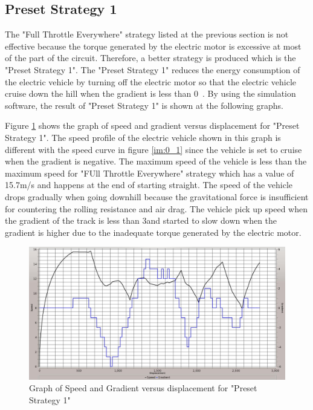 \subsection{Preset Strategy 1}

The "Full Throttle Everywhere" strategy listed at the previous section is not effective because the torque generated by the electric motor is excessive at most of the part of the circuit. Therefore, a better strategy is produced which is the "Preset Strategy 1". The "Preset Strategy 1" reduces the energy consumption of the electric vehicle by turning off the electric motor so that the electric vehicle cruise down the hill when the gradient is less than 0\textdegree \ . By using the simulation software, the result of "Preset Strategy 1" is shown at the following graphs.

Figure \ref{im:1_1} shows the graph of speed and gradient versus displacement for "Preset Strategy 1". The speed profile of the electric vehicle shown in this graph is different with the speed curve in figure \ref{im:0_1} since the vehicle is set to cruise when the gradient is negative. The maximum speed of the vehicle is less than the maximum speed for "FUll Throttle Everywhere" strategy which has a value of 15.7m/s and happens at the end of starting straight. The speed of the vehicle drops gradually when going downhill because the gravitational force is insufficient for countering the rolling resistance and air drag. The vehicle pick up speed when the gradient of the track is less than 3\textdegree and started to slow down when the gradient is higher due to the inadequate torque generated by the electric motor.

\begin{figure}[htb]
	\centering
	\includegraphics[width=6in]{images/1_1.jpg}
	\caption{Graph of Speed and Gradient versus displacement for "Preset Strategy 1"}
	\label{im:1_1}
\end{figure}

